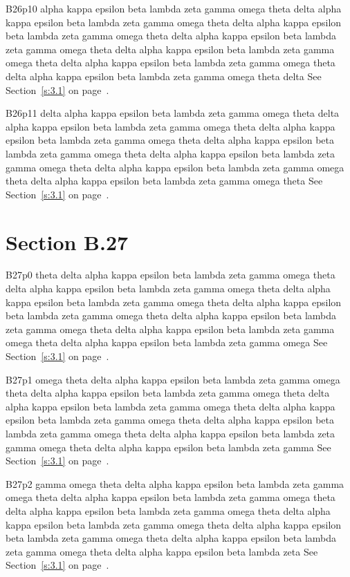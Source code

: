 B26p10 alpha kappa epsilon beta lambda zeta gamma omega theta delta alpha kappa epsilon beta lambda zeta gamma omega theta delta alpha kappa epsilon beta lambda zeta gamma omega theta delta alpha kappa epsilon beta lambda zeta gamma omega theta delta alpha kappa epsilon beta lambda zeta gamma omega theta delta alpha kappa epsilon beta lambda zeta gamma omega theta delta alpha kappa epsilon beta lambda zeta gamma omega theta delta See Section~\ref{s:3.1} on page~\pageref{s:3.1}.

B26p11 delta alpha kappa epsilon beta lambda zeta gamma omega theta delta alpha kappa epsilon beta lambda zeta gamma omega theta delta alpha kappa epsilon beta lambda zeta gamma omega theta delta alpha kappa epsilon beta lambda zeta gamma omega theta delta alpha kappa epsilon beta lambda zeta gamma omega theta delta alpha kappa epsilon beta lambda zeta gamma omega theta delta alpha kappa epsilon beta lambda zeta gamma omega theta See Section~\ref{s:3.1} on page~\pageref{s:3.1}.

\section{Section B.27}\label{s:B.27}
B27p0 theta delta alpha kappa epsilon beta lambda zeta gamma omega theta delta alpha kappa epsilon beta lambda zeta gamma omega theta delta alpha kappa epsilon beta lambda zeta gamma omega theta delta alpha kappa epsilon beta lambda zeta gamma omega theta delta alpha kappa epsilon beta lambda zeta gamma omega theta delta alpha kappa epsilon beta lambda zeta gamma omega theta delta alpha kappa epsilon beta lambda zeta gamma omega See Section~\ref{s:3.1} on page~\pageref{s:3.1}.

B27p1 omega theta delta alpha kappa epsilon beta lambda zeta gamma omega theta delta alpha kappa epsilon beta lambda zeta gamma omega theta delta alpha kappa epsilon beta lambda zeta gamma omega theta delta alpha kappa epsilon beta lambda zeta gamma omega theta delta alpha kappa epsilon beta lambda zeta gamma omega theta delta alpha kappa epsilon beta lambda zeta gamma omega theta delta alpha kappa epsilon beta lambda zeta gamma See Section~\ref{s:3.1} on page~\pageref{s:3.1}.

B27p2 gamma omega theta delta alpha kappa epsilon beta lambda zeta gamma omega theta delta alpha kappa epsilon beta lambda zeta gamma omega theta delta alpha kappa epsilon beta lambda zeta gamma omega theta delta alpha kappa epsilon beta lambda zeta gamma omega theta delta alpha kappa epsilon beta lambda zeta gamma omega theta delta alpha kappa epsilon beta lambda zeta gamma omega theta delta alpha kappa epsilon beta lambda zeta See Section~\ref{s:3.1} on page~\pageref{s:3.1}.

